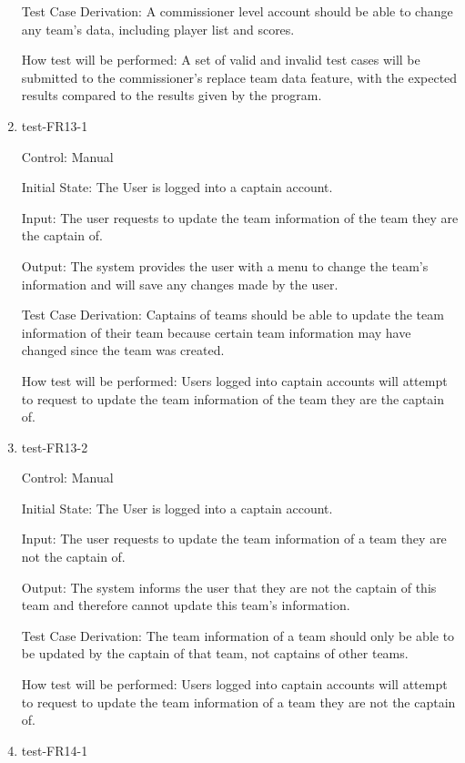 \documentclass[12pt, titlepage]{article}
\begin{document}
\begin{enumerate}
  Test Case Derivation: A commissioner level account should be able to change
  any team's data, including player list and scores.

  How test will be performed: A set of valid and invalid test cases will be
  submitted to the commissioner's replace team data feature, with the expected
  results compared to the results given by the program.

  \item{test-FR13-1\\}

  Control: Manual
           
  Initial State: The User is logged into a captain account.
           
  Input: The user requests to update the team information of the team they are
  the captain of.
           
  Output: The system provides the user with a menu to change the team's
  information and will save any changes made by the user.
 
  Test Case Derivation: Captains of teams should be able to update the team
  information of their team because certain team information may have changed
  since the team was created.
 
  How test will be performed: Users logged into captain accounts will attempt
  to request to update the team information of the team they are the captain of.

  \item{test-FR13-2\\}

  Control: Manual
           
  Initial State: The User is logged into a captain account.
           
  Input: The user requests to update the team information of a team they are
  not the captain of.
           
  Output: The system informs the user that they are not the captain of this team
  and therefore cannot update this team's information.
 
  Test Case Derivation: The team information of a team should only be able to be
  updated by the captain of that team, not captains of other teams.
 
  How test will be performed: Users logged into captain accounts will attempt
  to request to update the team information of a team they are not the captain
  of.

  \item{test-FR14-1\\}


\end{enumerate}
\end{document}
